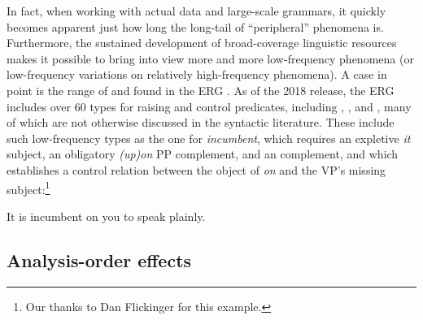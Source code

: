\documentclass[output=paper,nonflat]{langsci/langscibook}
\begin{document}
In fact, when working with actual data and large-scale grammars,
it quickly becomes apparent just how long the long-tail of ``peripheral'' phenomena is. Furthermore, the sustained development of broad-coverage linguistic resources makes it possible
to bring into view more and more low-frequency phenomena
(or low-frequency variations on relatively high-frequency phenomena).
A case in point is the range of  and  
found in the ERG \citep{Flickinger2000a,Flickinger2011a-u}.
As of the 2018 release, the ERG includes over 60 types for raising and control predicates,
including , , and ,
many of which are not otherwise discussed in the syntactic literature.
These include such low-frequency types as the one for \textit{incumbent},
which requires an expletive \textit{it} subject,
an obligatory \textit{(up)on} PP complement,
and an  complement,
and which establishes a control relation between
the object of \textit{on} and the VP's missing subject:\footnote{%
	Our thanks to Dan Flickinger for this example.
}

\begin{exe}
\ex\label{cl:incumbent} 
It is incumbent on you to speak plainly.
\end{exe}




\subsection{Analysis-order effects}
\end{document}
